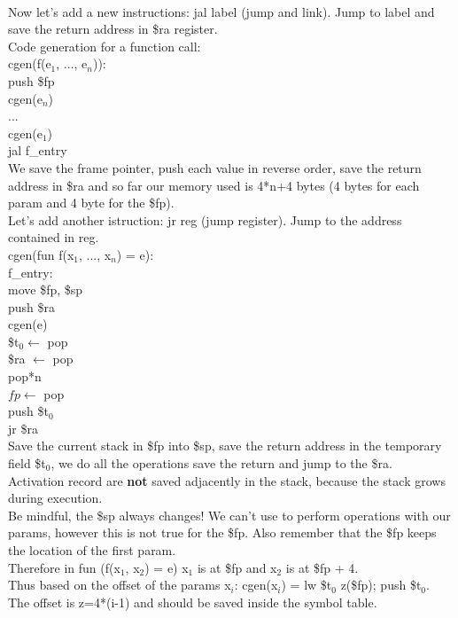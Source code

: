 \documentclass[12pt]{article}
\begin{document}
\\ Now let's add a new instructions: jal label (jump and link). Jump to label and save the return address in \$ra register.
\\ Code generation for a function call: 
\\ cgen(f(e$_1$, ..., e$_n$)):
\\ \hspace*{4mm} push \$fp
\\ \hspace*{4mm} cgen(e$_n$)
\\ \hspace*{4mm} ...
\\ \hspace*{4mm} cgen(e$_1$)
\\ \hspace*{4mm} jal f\_entry
\\ We save the frame pointer, push each value in reverse order, save the return address in \$ra and so far our memory used is 4*n+4 bytes (4 bytes for each param and 4 byte for the \$fp).
\\ Let's add another istruction: jr reg (jump register). Jump to the address contained in reg.
\\ cgen(fun f(x$_1$, ..., x$_n$) = e):
\\ \hspace*{4mm} f\_entry:
\\ \hspace*{4mm} move \$fp, \$sp
\\ \hspace*{4mm} push \$ra
\\ \hspace*{4mm} cgen(e)
\\ \hspace*{4mm} \$t$_0 \leftarrow$ pop 
\\ \hspace*{4mm} \$ra $\leftarrow$ pop 
\\ \hspace*{4mm} pop*n 
\\ \hspace*{4mm} $fp \leftarrow$ pop 
\\ \hspace*{4mm} push \$t$_0$ 
\\ \hspace*{4mm} jr \$ra
\\ Save the current stack in \$fp into \$sp, save the return address in the temporary field \$t$_0$, we do all the operations save the return and jump to the \$ra. 
\\ Activation record are \textbf{not} saved adjacently in the stack, because the stack grows during execution.
\\ Be mindful, the \$sp always changes! We can't use to perform operations with our params, however this is not true for the \$fp. Also remember that the \$fp keeps the location of the first param.
\\ Therefore in fun (f(x$_1$, x$_2$) = e) x$_1$ is at \$fp and x$_2$ is at \$fp + 4. 
\\ Thus based on the offset of the params x$_i$: cgen(x$_i$) = lw \$t$_0$ z(\$fp); push \$t$_0$. The offset is z=4*(i-1) and should be saved inside the symbol table. 
\end{document}
